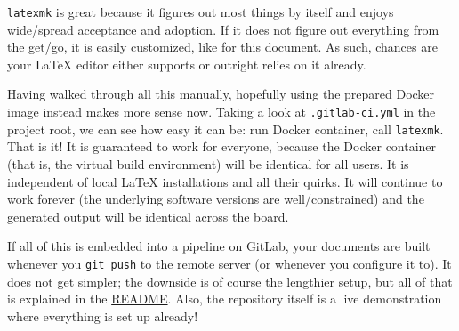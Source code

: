 \texttt{latexmk} is great because it figures out most things by itself and enjoys
wide\-/spread acceptance and adoption.
If it does not figure out everything from the get\-/go, it is easily customized,
like for this document.
As such, chances are your \LaTeX{} editor either supports or outright relies on it
already.

Having walked through all this manually, hopefully using the prepared Docker image
instead makes more sense now.
Taking a look at \texttt{.gitlab-ci.yml} in the project root, we can see how easy it
can be:
run Docker container, call \texttt{latexmk}.
That is it!
It is guaranteed to work for everyone, because the Docker container (that is, the
virtual build environment) will be identical for all users.
It is independent of local \LaTeX{} installations and all their quirks.
It will continue to work forever (the underlying software versions are well\-/constrained)
and the generated output will be identical across the board.

If all of this is embedded into a pipeline on GitLab, your documents are built whenever
you \texttt{git push} to the remote server (or whenever you configure it to).
It does not get simpler; the downside is of course the lengthier setup, but all of that
is explained in the
\href{https://collaborating.tuhh.de/cap7863/latex-git-cookbook/-/blob/master/README.md}{README}.
Also, the repository itself is a live demonstration where everything is set up already!
